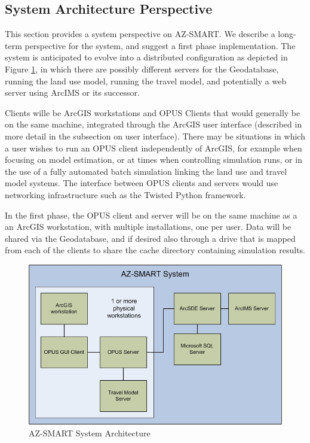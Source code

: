 \subsection{System Architecture Perspective}
This section provides a system perspective on AZ-SMART.  We describe a long-term perspective for the system, and suggest a first phase implementation.  The system is anticipated to evolve into a distributed configuration as depicted in Figure \ref{figSystem}, in which there are possibly different servers for the Geodatabase, running the land use model, running the travel model, and potentially a web server using ArcIMS or its successor.

Clients wille be ArcGIS workstations and OPUS Clients that would generally be on the same machine, integrated through the ArcGIS user interface (described in more detail in the subsection on user interface).  There may be situations in which a user wishes to run an OPUS client independently of ArcGIS, for example when focusing on model estimation, or at times when controlling simulation runs, or in the use of a fully automated batch simulation linking the land use and travel model systems.  The interface between OPUS clients and servers would use networking infrastructure such as the Twisted Python framework.  

In the first phase, the OPUS client and server will be on the same machine as a an ArcGIS workstation, with multiple installations, one per user.  Data will be shared via the Geodatabase, and if desired also through a drive that is mapped from each of the clients to share the cache directory containing simulation results.

\begin{figure}[h]
\begin{center}
\includegraphics[scale=0.5]{figures/AZ-SMART_system_diagram.jpg}
\caption{AZ-SMART System Architecture}
\label{figSystem}
\end{center}
\end{figure}
